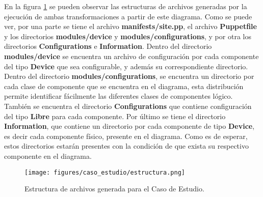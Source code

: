 En la figura \ref{fig:caso_estudio:estructura} se pueden observar las
estructuras de archivos generadas por la ejecución de ambas
transformaciones a partir de este diagrama. Como se puede ver, por una
parte se tiene el archivo \textbf{manifests/site.pp}, el archivo
\textbf{Puppetfile} y los directorios \textbf{modules/device} y
\textbf{modules/configurations}, y por otra los directorios
\textbf{Configurations} e \textbf{Information}. Dentro del directorio
\textbf{modules/device} se encuentra un archivo de configuración por
cada componente del tipo \textbf{Device} que sea configurable, y
además su correspondiente directorio. Dentro del directorio
\textbf{modules/configurations}, se encuentra un directorio por cada
clase de componente que se encuentra en el diagrama, esta distribución
permite identificar fácilmente las diferentes clases de componentes
lógico. También se encuentra el directorio \textbf{Configurations} que
contiene configuración del tipo \textbf{Libre} para cada
componente. Por último se tiene el directorio \textbf{Information},
que contiene un directorio por cada componente de tipo
\textbf{Device}, es decir cada componente físico, presente en el
diagrama. Como es de esperar, estos directorios estarán presentes con
la condición de que exista su respectivo componente en el diagrama.

\begin{figure}[htbp]
    \centering
    \texttt{[image: figures/caso\_estudio/estructura.png]}
    \caption{Estructura de archivos generada para el Caso de Estudio.}
    \label{fig:caso_estudio:estructura}
\end{figure}

